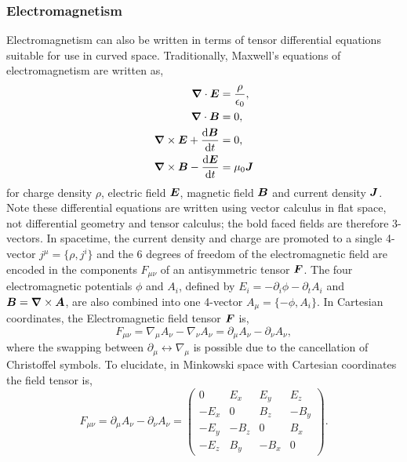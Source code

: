 \subsubsection{Electromagnetism}
Electromagnetism can also be written in terms of tensor differential equations suitable for use in curved space. Traditionally, Maxwell's equations of electromagnetism are written as,
\begin{align}
\boldsymbol{\nabla} \cdot \boldsymbol{E} &= \frac{\rho}{\epsilon_0} ,\label{intro:eq:max1}\\
\boldsymbol{\nabla} \cdot \boldsymbol{B} &= 0 ,\label{intro:eq:max2}\\
\boldsymbol{\nabla} \times \boldsymbol{E}  + \frac{\dd \boldsymbol{B}}{\dd t} &=0,\label{intro:eq:max3}\\
\boldsymbol{\nabla} \times \boldsymbol{B} -\frac{\dd \boldsymbol{E}}{\dd t} &= \mu_0 \boldsymbol{J}\label{intro:eq:max4}
\end{align}
for charge density $\rho$, electric field $\boldsymbol{E}$, magnetic field $\boldsymbol{B}$ and current density $\boldsymbol{J}$. Note these differential equations are written using vector calculus in flat space, not differential geometry and tensor calculus; the bold faced fields are therefore 3-vectors. In spacetime, the current density and charge are promoted to a single 4-vector $j^\mu = \{\rho,j^i\}$ and the 6 degrees of freedom of the electromagnetic field are encoded in the components $F_{\mu\nu}$ of an antisymmetric tensor $\boldsymbol{F}$. The four electromagnetic potentials $\phi$ and $A_i$, defined by $E_i = -\partial_i \phi - \partial_t A_i$ and $\boldsymbol{B} = \boldsymbol{\nabla}\times \boldsymbol{A}$, are also combined into one 4-vector $A_\mu = \{-\phi,A_i\}$. In Cartesian coordinates, the Electromagnetic field tensor $\boldsymbol{F}$ is,
\begin{equation}
F_{\mu\nu} = \nabla_\mu A_\nu - \nabla_\nu A_\nu = \partial_\mu A_\nu - \partial_\nu A_\nu ,
\end{equation}
where the swapping between $\partial_\mu \leftrightarrow \nabla_\mu$ is possible due to the cancellation of Christoffel symbols. To elucidate, in Minkowski space with Cartesian coordinates the field tensor is,
\begin{equation}
F_{\mu\nu} = \partial_\mu A_\nu - \partial_\nu A_\nu = \begin{pmatrix} 0 & E_x & E_y & E_z \\  -E_x & 0 & B_z & -B_y \\  -E_y & -B_z & 0 & B_x \\  -E_z & B_y & -B_x & 0 \end{pmatrix}.
\end{equation}
